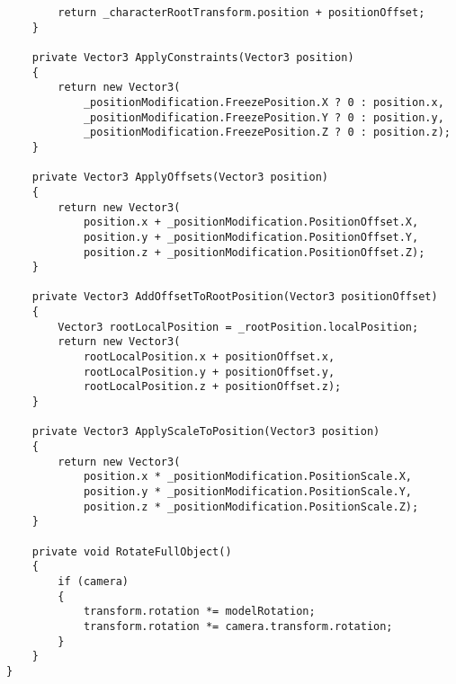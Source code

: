 \begin{verbatim}
        return _characterRootTransform.position + positionOffset;
    }

    private Vector3 ApplyConstraints(Vector3 position)
    {
        return new Vector3(
            _positionModification.FreezePosition.X ? 0 : position.x,
            _positionModification.FreezePosition.Y ? 0 : position.y,
            _positionModification.FreezePosition.Z ? 0 : position.z);
    }

    private Vector3 ApplyOffsets(Vector3 position)
    {
        return new Vector3(
            position.x + _positionModification.PositionOffset.X,
            position.y + _positionModification.PositionOffset.Y,
            position.z + _positionModification.PositionOffset.Z);
    }

    private Vector3 AddOffsetToRootPosition(Vector3 positionOffset)
    {
        Vector3 rootLocalPosition = _rootPosition.localPosition;
        return new Vector3(
            rootLocalPosition.x + positionOffset.x,
            rootLocalPosition.y + positionOffset.y,
            rootLocalPosition.z + positionOffset.z);
    }

    private Vector3 ApplyScaleToPosition(Vector3 position)
    {
        return new Vector3(
            position.x * _positionModification.PositionScale.X,
            position.y * _positionModification.PositionScale.Y,
            position.z * _positionModification.PositionScale.Z);
    }

    private void RotateFullObject()
    {
        if (camera)
        {
            transform.rotation *= modelRotation;
            transform.rotation *= camera.transform.rotation;
        }
    }
}
\end{verbatim}
